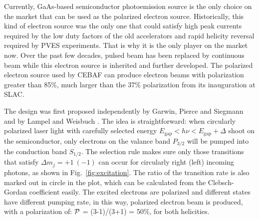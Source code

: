 Currently, GaAs-based semiconductor photoemission source is %
the only choice on the market that can be used as the polarized electron source.
Historically, this kind of electron source was the only one that could satisfy high peak 
currents required by the low duty factors of the old accelerators and rapid helicity 
reversal required by PVES experiments. That is why it is the only player on the market now.
Over the past few decades, pulsed beam has been replaced by continuous beam while
this electron source is inherited and further developed. The polarized electron
source used by CEBAF can produce electron beams with polarization greater than
85\%, much larger than the 37\% polarization from its inauguration at SLAC. \cite{PRESCOTT1978347}

The design was first proposed independently by Garwin, Pierce and Siegmann \cite{GARWIN}
and by Lampel and Weisbuch \cite{LAMPEL1975877}. The idea is straightforward:
when circularly polarized laser light with carefully selected energy 
$E_{\text{gap}} < h\nu < E_{\text{gap}} + \Delta$
shoot on the semiconductor, only electrons on the valance band $P_{3/2}$ will be
pumped into the conduction band $S_{1/2}$. The selection rule makes sure only
those transitions that satisfy $\Delta m_j = +1 \ (-1)$ can occur for circularly
right (left) incoming photons, as shown in Fig.~\ref{fig:excitation}.
The ratio of the transition rate is also marked out in circle in the plot, 
which can be calculated from the Clebsch-Gordan coefficient easily. %
The excited electrons are polarized and different states have different pumping rate, 
in this way, polarized electron beam is produced, with a polarization of: $\mathcal{P}$ = (3-1)/(3+1) = 50\%,
for both helicities.

